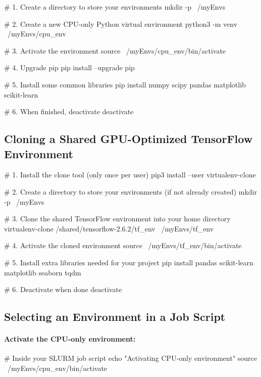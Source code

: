 \documentclass[11pt]{article}
\begin{document}
\begin{codeblock}
# 1. Create a directory to store your environments
mkdir -p ~/myEnvs

# 2. Create a new CPU-only Python virtual environment
python3 -m venv ~/myEnvs/cpu_env

# 3. Activate the environment
source ~/myEnvs/cpu_env/bin/activate

# 4. Upgrade pip
pip install --upgrade pip

# 5. Install some common libraries
pip install numpy scipy pandas matplotlib scikit-learn

# 6. When finished, deactivate
deactivate
\end{codeblock}

\subsection{Cloning a Shared GPU-Optimized TensorFlow Environment}
\label{subsec:clone-env-example}

\begin{codeblock}
# 1. Install the clone tool (only once per user)
pip3 install --user virtualenv-clone

# 2. Create a directory to store your environments (if not already created)
mkdir -p ~/myEnvs

# 3. Clone the shared TensorFlow environment into your home directory
virtualenv-clone /shared/tensorflow-2.6.2/tf_env ~/myEnvs/tf_env

# 4. Activate the cloned environment
source ~/myEnvs/tf_env/bin/activate

# 5. Install extra libraries needed for your project
pip install pandas scikit-learn matplotlib seaborn tqdm

# 6. Deactivate when done
deactivate
\end{codeblock}

\subsection{Selecting an Environment in a Job Script}
\label{subsec:select-env-example}

\paragraph{Activate the CPU-only environment:\\}
\begin{codeblock}
# Inside your SLURM job script
echo "Activating CPU-only environment"
source ~/myEnvs/cpu_env/bin/activate
\end{codeblock}
\end{document}
